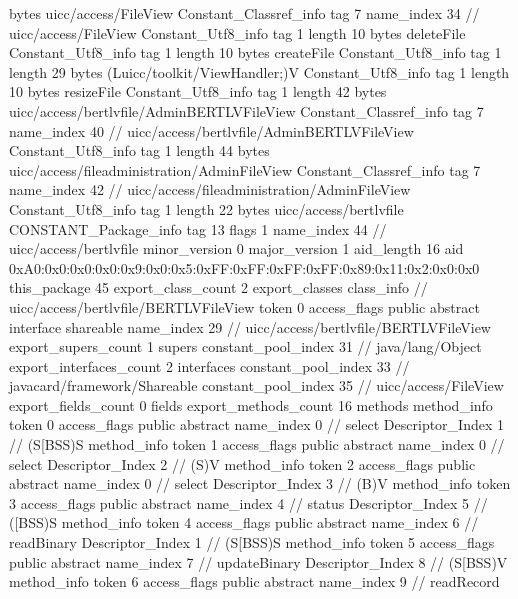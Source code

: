 {{{			bytes	uicc/access/FileView
		}
		Constant_Classref_info {
			tag	7
			name_index	34		// uicc/access/FileView
		}
		Constant_Utf8_info {
			tag	1
			length	10
			bytes	deleteFile
		}
		Constant_Utf8_info {
			tag	1
			length	10
			bytes	createFile
		}
		Constant_Utf8_info {
			tag	1
			length	29
			bytes	(Luicc/toolkit/ViewHandler;)V
		}
		Constant_Utf8_info {
			tag	1
			length	10
			bytes	resizeFile
		}
		Constant_Utf8_info {
			tag	1
			length	42
			bytes	uicc/access/bertlvfile/AdminBERTLVFileView
		}
		Constant_Classref_info {
			tag	7
			name_index	40		// uicc/access/bertlvfile/AdminBERTLVFileView
		}
		Constant_Utf8_info {
			tag	1
			length	44
			bytes	uicc/access/fileadministration/AdminFileView
		}
		Constant_Classref_info {
			tag	7
			name_index	42		// uicc/access/fileadministration/AdminFileView
		}
		Constant_Utf8_info {
			tag	1
			length	22
			bytes	uicc/access/bertlvfile
		}
		CONSTANT_Package_info {
			tag	13
			flags	1
			name_index	44		// uicc/access/bertlvfile
			minor_version	0
			major_version	1
			aid_length	16
			aid	0xA0:0x0:0x0:0x0:0x9:0x0:0x5:0xFF:0xFF:0xFF:0xFF:0x89:0x11:0x2:0x0:0x0
		}
	}
	this_package	45
	export_class_count	2
	export_classes {
		class_info {		// uicc/access/bertlvfile/BERTLVFileView
			token	0
			access_flags	public abstract interface shareable
			name_index	29		// uicc/access/bertlvfile/BERTLVFileView
			export_supers_count	1
			supers {
				constant_pool_index	31		// java/lang/Object
			}
			export_interfaces_count	2
			interfaces {
				constant_pool_index	33		// javacard/framework/Shareable
				constant_pool_index	35		// uicc/access/FileView
			}
			export_fields_count	0
			fields {
			}
			export_methods_count	16
			methods {
				method_info {
					token	0
					access_flags	public abstract
					name_index	0		// select
					Descriptor_Index	1		// (S[BSS)S
				}
				method_info {
					token	1
					access_flags	public abstract
					name_index	0		// select
					Descriptor_Index	2		// (S)V
				}
				method_info {
					token	2
					access_flags	public abstract
					name_index	0		// select
					Descriptor_Index	3		// (B)V
				}
				method_info {
					token	3
					access_flags	public abstract
					name_index	4		// status
					Descriptor_Index	5		// ([BSS)S
				}
				method_info {
					token	4
					access_flags	public abstract
					name_index	6		// readBinary
					Descriptor_Index	1		// (S[BSS)S
				}
				method_info {
					token	5
					access_flags	public abstract
					name_index	7		// updateBinary
					Descriptor_Index	8		// (S[BSS)V
				}
				method_info {
					token	6
					access_flags	public abstract
					name_index	9		// readRecord
}}}}}
